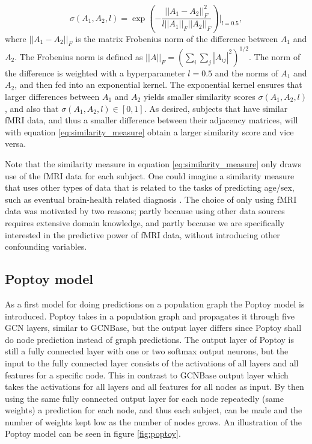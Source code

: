 \begin{equation}
    \sigma\left(A_1, A_2, l\right) = \exp{\left(- \frac{||A_1 - A_2||_F^2}{l||A_1||_F ||A_2||_F} \right)}\biggr\rvert_{l=0.5},
    \label{eq:similarity_measure}
\end{equation}
where $||A_1 - A_2 ||_F$ is the matrix Frobenius norm of the difference between $A_1$ and $A_2$. The Frobenius norm is defined as $||A||_F = \left( \sum_i \sum_j |A_{ij}|^2 \right)^{1/2}$. The norm of the difference is weighted with a hyperparameter $l=0.5$ and the norms of $A_1$ and $A_2$, and then fed into an exponential kernel. The exponential kernel ensures that larger differences between $A_1$ and $A_2$ yields smaller similarity scores $\sigma\left(A_1, A_2, l\right)$, and also that  $\sigma\left(A_1, A_2, l\right) \in \left[0, 1\right]$. As desired, subjects that have similar fMRI data, and thus a smaller difference between their adjacency matrices, will with equation \eqref{eq:similarity_measure} obtain a larger similarity score and vice versa. 

Note that the similarity measure in equation \eqref{eq:similarity_measure} only draws use of the fMRI data for each subject. One could imagine a similarity measure that uses other types of data that is related to the tasks of predicting age/sex, such as eventual brain-health related diagnosis \cite{stankeviciute}. The choice of only using fMRI data was motivated by two reasons; partly because using other data sources requires extensive domain knowledge, and partly because we are specifically interested in the predictive power of fMRI data, without introducing other confounding variables.

\subsection{Poptoy model}
As a first model for doing predictions on a population graph the Poptoy model is introduced. Poptoy takes in a population graph and propagates it through five GCN layers, similar to GCNBase, but the output layer differs since Poptoy shall do node prediction instead of graph predictions. The output layer of Poptoy is still a fully connected layer with one or two softmax output neurons, but the input to the fully connected layer consists of the activations of all layers and all features for a specific node. This in contrast to GCNBase output layer which takes the activations for all layers and all features for all nodes as input. By then using the same fully connected output layer for each node repeatedly (same weights) a prediction for each node, and thus each subject, can be made and the number of weights kept low as the number of nodes grows. An illustration of the Poptoy model can be seen in figure \ref{fig:poptoy}.

